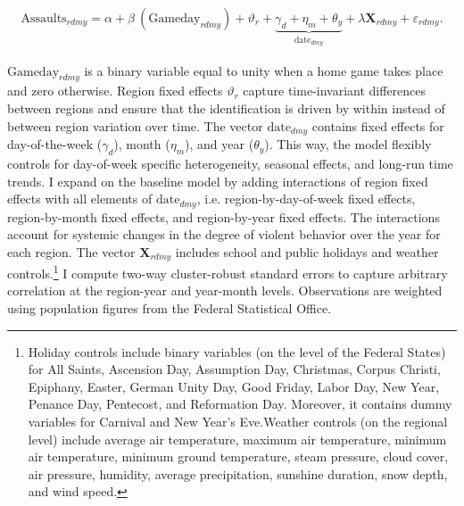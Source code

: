 \begin{align}
\text{Assaults}_{rdmy} = \alpha + \beta\ (\text{Gameday}_{rdmy}) + \vartheta_r + \underbrace{\gamma_d + \eta_m + \theta_y}_{\text{date}_{dmy}} + \lambda \mathbf{X}_{rdmy} + \varepsilon_{rdmy}
\label{eq_soc_ext:model}.
\end{align}

$\text{Gameday}_{rdmy}$ is a binary variable equal to unity when a home game takes place and zero otherwise. Region fixed effects $\vartheta_r$ capture time-invariant differences between regions and ensure that the identification is driven by within instead of between region variation over time. The vector $\text{date}_{dmy}$ contains fixed effects for day-of-the-week ($\gamma_d$), month ($\eta_m$), and year ($\theta_y$). This way, the model flexibly controls for day-of-week specific heterogeneity, seasonal effects, and long-run time trends. I expand on the baseline model by adding interactions of region fixed effects with all elements of $\text{date}_{dmy}$, i.e. region-by-day-of-week fixed effects, region-by-month fixed effects, and region-by-year fixed effects. The interactions account for systemic changes in the degree of violent behavior over the year for each region. The vector $\mathbf{X}_{rdmy}$ includes school and public holidays and weather controls.\footnote{Holiday controls include binary variables (on the level of the Federal States) for All Saints, Ascension Day, Assumption Day, Christmas, Corpus Christi, Epiphany, Easter, German Unity Day, Good Friday, Labor Day, New Year, Penance Day, Pentecost, and Reformation Day. Moreover, it contains dummy variables for Carnival and New Year's Eve.\newline Weather controls (on the regional level) include average air temperature, maximum air temperature, minimum air temperature, minimum ground temperature, steam pressure, cloud cover, air pressure, humidity, average precipitation, sunshine duration, snow depth, and wind speed.} I compute two-way cluster-robust standard errors to capture arbitrary correlation at the region-year and year-month levels. Observations are weighted using population figures from the Federal Statistical Office.


